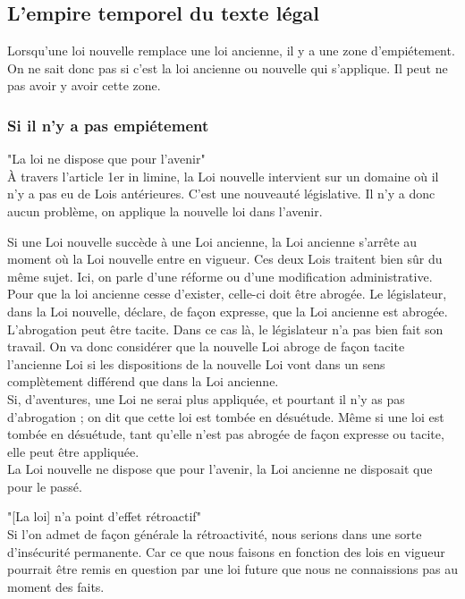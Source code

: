\subsection{L'empire temporel du texte légal}

Lorsqu'une loi nouvelle remplace une loi ancienne, il y a une zone d'empiétement. On ne sait donc pas si c'est la loi ancienne ou nouvelle qui s'applique. Il peut ne pas avoir y avoir cette zone.

\subsubsection{Si il n'y a pas empiétement}

"La loi ne dispose que pour l'avenir" \\ 
À travers l'article 1er in limine, la Loi nouvelle intervient sur un domaine où il n'y a pas eu de Lois antérieures. C'est une nouveauté législative. Il n'y a donc aucun problème, on applique la nouvelle loi dans l'avenir.


Si une Loi nouvelle succède à une Loi ancienne, la Loi ancienne s'arrête au moment où la Loi nouvelle entre en vigueur. Ces deux Lois traitent bien sûr du même sujet. Ici, on parle d'une réforme ou d'une modification administrative. \\
Pour que la loi ancienne cesse d'exister, celle-ci doit être abrogée. Le législateur, dans la Loi nouvelle, déclare, de façon expresse, que la Loi ancienne est abrogée. \\
L'abrogation peut être tacite. Dans ce cas là, le législateur n'a pas bien fait son travail. On va donc considérer que la nouvelle Loi abroge de façon tacite l'ancienne Loi si les dispositions de la nouvelle Loi vont dans un sens complètement différend que dans la Loi ancienne. \\
Si, d'aventures, une Loi ne serai plus appliquée, et pourtant il n'y as pas d'abrogation ; on dit que cette loi est tombée en désuétude. Même si une loi est tombée en désuétude, tant qu'elle n'est pas abrogée de façon expresse ou tacite, elle peut être appliquée. \\
La Loi nouvelle ne dispose que pour l'avenir, la Loi ancienne ne disposait que pour le passé.


"[La loi] n'a point d'effet rétroactif" \\
Si l'on admet de façon générale la rétroactivité, nous serions dans une sorte d'insécurité permanente. Car ce que nous faisons en fonction des lois en vigueur pourrait être remis en question par une loi future que nous ne connaissions pas au moment des faits.


